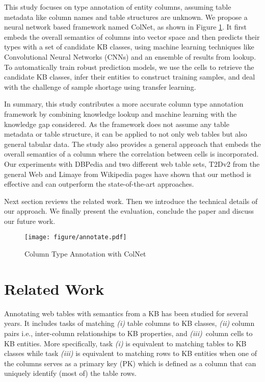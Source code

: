\documentclass[letterpaper]{article}
\newcommand{\ernesto}[1]{{\color{black}#1}}
\newcommand{\rv}[1]{{\color{black}#1}}
\newcommand{\camera}[1]{{\color{black}#1}}
\newcommand{\ColNet}{\textsf{ColNet}\xspace}
\begin{document}
This study focuses on type annotation of entity columns,
assuming \rv{table metadata like column names and table structures are unknown.}
We propose a neural network based framework named \ColNet, as shown in Figure \ref{fig:annotation}.
It first embeds the overall semantics of columns into vector space 
and then predicts their types with a set of candidate KB classes,
using machine learning techniques like Convolutional Neural Networks (CNNs) and an ensemble of results from lookup.
\rv{To automatically train robust prediction models,
we use the cells to retrieve the candidate KB classes,
infer their entities to construct training samples,
and deal with the challenge of sample shortage 
using transfer learning.}


In summary, this study contributes a more accurate column type annotation framework by \rv{combining} knowledge lookup and machine learning \rv{with the knowledge gap considered.
As the framework does not assume any table metadata or table structure,
it can be applied to not only web tables but also general tabular data.}
The study also provides a general approach that embeds the overall \rv{semantics} of a column \camera{where the correlation between cells is incorporated}. 
Our experiments with DBPedia and two different web table sets, 
T2Dv2 from the general Web \cite{lehmberg2016large} and Limaye from Wikipedia pages \cite{limaye2010annotating} have shown that our method is effective and can outperform the \rv{state-of-the-art approaches.}

Next section reviews the related work.
Then we introduce the technical details of our approach.
We finally present the evaluation, 
conclude the paper and discuss our future work.

\begin{figure}[!t]
\centering
\texttt{[image: figure/annotate.pdf]}
\caption{Column Type Annotation with \ColNet}
\label{fig:annotation}
\end{figure}

\section{Related Work}
Annotating web tables with semantics from a KB
has been studied for several years.
It includes tasks of
matching \textit{(i)} table columns to KB classes, 
\textit{(ii)} column pairs i.e., inter-column relationships to KB properties, 
and \textit{(iii)}~column cells to KB entities.
\ernesto{More specifically}, task \textit{(i)} is \ernesto{equivalent to} matching tables to KB classes
while task \textit{(iii)} is equivalent to matching rows to KB entities when \rv{one of the columns serves as a primary key (PK) which is defined as a column that can uniquely identify (most of) the table rows.
}
\end{document}
